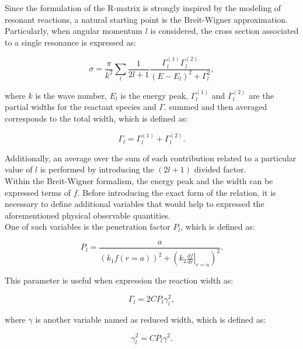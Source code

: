 \documentclass[openany]{book}
\begin{document}
Since the formulation of the R-matrix is strongly inspired by the modeling of resonant reactions, a natural starting point is the Breit-Wigner approximation. Particularly, when angular momentum $l$ is considered, the cross section associated to a single resonance is expressed as:

\begin{equation}  \label{eq:rmatrix_breitWigner}
	\sigma = \frac{\pi}{k^2} \sum_{l} \frac{1}{2l + 1} \frac{\Gamma^{(1)}_{l} \Gamma^{(2)}_{l} }{(E - E_l)^2  + \Gamma^2_l }, 
\end{equation}

where $k$ is the wave number, $E_l$ is the energy peak,  $\Gamma^{(1)}_{l}$ and $\Gamma^{(2)}_{l}$ are the partial widths for the reactant species and $\Gamma$. summed and then averaged corresponds to the total width, which is defined as: 

\begin{equation}  \label{eq:rmatrix_totalWidth}
	\Gamma_l = \Gamma^{(1)}_{l} + \Gamma^{(2)}_{l}. 
\end{equation}

Additionally, an average over the sum of each contribution related to a particular value of $l$ is performed by introducing the $(2l +1)$ divided factor. \\

Within the Breit-Wigner formalism, the energy peak and the width can be expressed terms of $f$. Before introducing the exact form of the relation, it is necessary to define additional variables that would help to expressed the aforementioned physical observable quantities.  \\

One of such variables is the penetration factor $P_l$, which is defined as: 

\begin{equation}  \label{eq:rmatrix_penetrationFactor}
	P_l = \frac{a}{(k_1 f(r = a ))^2 + \left(k_2 \left.\frac{df}{dr}\right|_{r = a} \right)^2 }.
\end{equation}

This parameter is useful when expression the reaction width as: 

\begin{equation}   \label{eq:rmatrix_width_penetration}
	\Gamma_l = 2CP_l\gamma^2_l,
\end{equation}

where $\gamma$ is another variable named as reduced width,  which is defined as: 

\begin{equation}   \label{eq:rmatrix_reducedWidth}
	\gamma^2_l =C P_l\gamma^2.
\end{equation}
\end{document}
